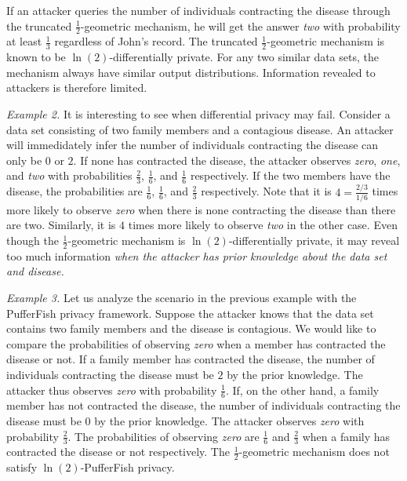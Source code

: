 If an attacker queries the number of individuals contracting the
disease through the truncated $\frac{1}{2}$-geometric mechanism, 
he will get the answer \textit{two} with probability at least
$\frac{1}{3}$ regardless of John's record. The truncated
$\frac{1}{2}$-geometric mechanism is known to be
$\ln(2)$-differentially private. For any two similar data sets, the
mechanism always have similar output distributions. Information
revealed to attackers is therefore limited.

\noindent
\textit{Example 2.}
It is interesting to see when differential privacy may fail. Consider
a data set consisting of two family members and a contagious
disease. An attacker will immedidately infer the number of individuals
contracting the disease can only be $0$ or $2$. If none has contracted
the disease, the attacker observes \textit{zero}, \textit{one}, and
\textit{two} with probabilities $\frac{2}{3}$, $\frac{1}{6}$, and
$\frac{1}{6}$ respectively. If the two members have the disease, the
probabilities are $\frac{1}{6}$, $\frac{1}{6}$, and $\frac{2}{3}$
respectively. Note that it is $4 = \frac{2/3}{1/6}$ times more likely
to observe \textit{zero} when there is none contracting the disease
than there are two. Similarly, it is $4$ times more likely to observe
\textit{two} in the other case. Even though the
$\frac{1}{2}$-geometric mechanism is $\ln(2)$-differentially private,
it may reveal too much information \emph{when the attacker has prior
 knowledge about the data set and disease.}


\noindent
\textit{Example 3.}
Let us analyze the scenario in the previous example with the
PufferFish privacy framework. Suppose the attacker knows that the data
set contains two family members and the disease is contagious. We
would like to compare the probabilities of observing \textit{zero}
when a member has contracted the disease or not. If a family member
has contracted the disease, the number of individuals contracting
the disease must be $2$ by the prior knowledge. The attacker thus
observes \textit{zero} with probability $\frac{1}{6}$.
If, on the other hand, a family member has not contracted
the disease, the number of individuals contracting the disease must be
$0$ by the prior knowledge. The attacker observes \textit{zero}
with probability $\frac{2}{3}$. The probabilities of observing
\textit{zero} are $\frac{1}{6}$ and $\frac{2}{3}$ when a family
has contracted the disease or not respectively. The
$\frac{1}{2}$-geometric mechanism does not satisfy 
$\ln(2)$-PufferFish privacy. 

